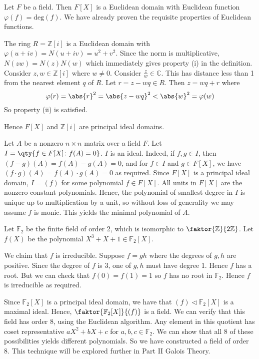 \begin{example}
	Let \( F \) be a field.
	Then \( F[X] \) is a Euclidean domain with Euclidean function \( \varphi(f) = \mathrm{deg}(f) \).
	We have already proven the requisite properties of Euclidean functions.

	The ring \( R = \mathbb Z[i] \) is a Euclidean domain with \( \varphi(u+iv) = N(u+iv) = u^2+v^2 \).
	Since the norm is multiplicative, \( N(zw) = N(z)N(w) \) which immediately gives property (i) in the definition.
	Consider \( z, w \in \mathbb Z[i] \) where \( w \neq 0 \).
	Consider \( \frac{z}{w} \in \mathbb C \).
	This has distance less than 1 from the nearest element \( q \) of \( R \).
	Let \( r = z - w q \in R \).
	Then \( z = w q + r \) where
	\[
		\varphi(r) = \abs{r}^2 = \abs{z - w q}^2 < \abs{w}^2 = \varphi(w)
	\]
	So property (ii) is satisfied.

	Hence \( F[X] \) and \( \mathbb Z[i] \) are principal ideal domains.
\end{example}
\begin{example}
	Let \( A \) be a nonzero \( n \times n \) matrix over a field \( F \).
	Let \( I = \qty{f \in F[X] \colon f(A) = 0} \).
	\( I \) is an ideal.
	Indeed, if \( f, g \in I \), then \( (f-g)(A) = f(A) - g(A) = 0 \), and for \( f \in I \) and \( g \in F[X] \), we have \( (f \cdot g)(A) = f(A) \cdot g(A) = 0 \) as required.
	Since \( F[X] \) is a principal ideal domain, \( I = (f) \) for some polynomial \( f \in F[X] \).
	All units in \( F[X] \) are the nonzero constant polynomials.
	Hence, the polynomial of smallest degree in \( I \) is unique up to multiplication by a unit, so without loss of generality we may assume \( f \) is monic.
	This yields the minimal polynomial of \( A \).
\end{example}
\begin{example}
	Let \( \mathbb F_2 \) be the finite field of order 2, which is isomorphic to \( \faktor{\mathbb Z}{2 \mathbb Z} \).
	Let \( f(X) \) be the polynomial \( X^3 + X + 1 \in \mathbb F_2[X] \).

	We claim that \( f \) is irreducible.
	Suppose \( f = gh \) where the degrees of \( g, h \) are positive.
	Since the degree of \( f \) is 3, one of \( g, h \) must have degree 1.
	Hence \( f \) has a root.
	But we can check that \( f(0) = f(1) = 1 \) so \( f \) has no root in \( \mathbb F_2 \).
	Hence \( f \) is irreducible as required.

	Since \( \mathbb F_2[X] \) is a principal ideal domain, we have that \( (f) \vartriangleleft \mathbb F_2[X] \) is a maximal ideal.
	Hence, \( \faktor{\mathbb F_2[X]}{(f)} \) is a field.
	We can verify that this field has order 8, using the Euclidean algorithm.
	Any element in this quotient has coset representative \( aX^2 + bX + c \) for \( a,b,c \in \mathbb F_2 \).
	We can show that all 8 of these possibilities yields different polynomials.
	So we have constructed a field of order 8.
	This technique will be explored further in Part II Galois Theory.
\end{example}
